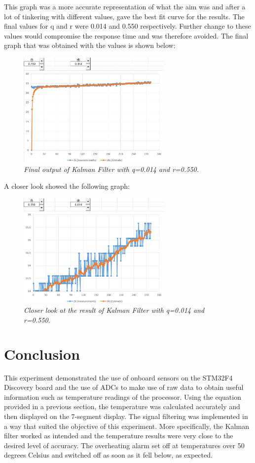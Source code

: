 \documentclass{article}
\begin{document}
\begin{itemize}
This graph was a more accurate representation of what the aim was and after a lot of tinkering with different values, gave the best fit curve for the results. The final values for q and r were 0.014 and 0.550 respectively. Further change to these values would compromise the response time and was therefore avoided. The final graph that was obtained with the values is shown below:\\
\begin{figure}[!ht]
\centering 
\includegraphics[width=7.5cm]{fig_4.png}
\caption{\small \sl Final output of Kalman Filter with q=0.014 and r=0.550.}  
\end{figure}

\newpage
A closer look showed the following graph:
\begin{figure}[!ht]
\centering 
\includegraphics[width=7.5cm]{fig_5.png}
\caption{\small \sl Closer look at the result of Kalman Filter with q=0.014 and r=0.550.}  
\end{figure}

\end{itemize}

\section{Conclusion}
This experiment demonstrated the use of onboard sensors on the STM32F4 Discovery board and the use of ADCs to make use of raw data to obtain useful information such as temperature readings of the processor. Using the equation provided in a previous section, the temperature was calculated accurately and then displayed on the 7-segment display. The signal filtering was implemented in a way that suited the objective of this experiment. More specifically, the Kalman filter worked as intended and the temperature results were very close to the desired level of accuracy. The overheating alarm set off at temperatures over 50 degrees Celsius and switched off as soon as it fell below, as expected. 
\newpage
\end{document}
